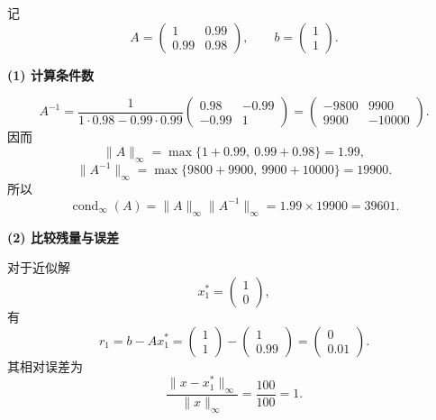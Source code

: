 \documentclass[11pt, a4paper]{ctexart}
\begin{document}
\begin{solution}
    记
    \[
        A =
        \begin{pmatrix}
            1 & 0.99 \\
            0.99 & 0.98
        \end{pmatrix},
        \qquad
        b =
        \begin{pmatrix}
            1 \\
            1
        \end{pmatrix}.
    \]

    \textbf{(1) 计算条件数}

    \[
        A^{-1}
        =
        \frac{1}{1 \cdot 0.98 - 0.99 \cdot 0.99}
        \begin{pmatrix}
            0.98 & -0.99 \\
            -0.99 & 1
        \end{pmatrix}
        =
        \begin{pmatrix}
            -9800 & 9900 \\
            9900 & -10000
        \end{pmatrix}.
    \]
    因而
    \[
        \|A\|_{\infty} = \max\{1 + 0.99,\ 0.99 + 0.98\} = 1.99,
    \]
    \[
        \|A^{-1}\|_{\infty} = \max\{9800 + 9900,\ 9900 + 10000\} = 19900.
    \]
    所以
    \[
        \operatorname{cond}_{\infty}(A)
        = \|A\|_{\infty}\|A^{-1}\|_{\infty}
        = 1.99 \times 19900
        = 39601.
    \]

    \textbf{(2) 比较残量与误差}

    对于近似解
    \[
        x_1^* =
        \begin{pmatrix}
            1 \\
            0
        \end{pmatrix},
    \]
    有
    \[
        r_1 = b - Ax_1^*
        =
        \begin{pmatrix}
            1 \\
            1
        \end{pmatrix}
        -
        \begin{pmatrix}
            1 \\
            0.99
        \end{pmatrix}
        =
        \begin{pmatrix}
            0 \\
            0.01
        \end{pmatrix}.
    \]
    其相对误差为
    \[
        \frac{\|x - x_1^*\|_{\infty}}{\|x\|_{\infty}}
        =
        \frac{100}{100}
        = 1.
    \]


\end{solution}
\end{document}
